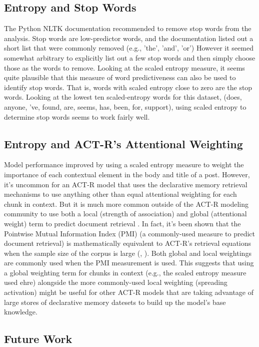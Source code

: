 \documentclass[10pt,letterpaper]{article}
\begin{document}
\subsection{Entropy and Stop Words}

The Python NLTK documentation \cite{Bird2009} recommended to remove stop words from the analysis.
Stop words are low-predictor words, and the documentation listed out a short list that were commonly removed (e.g., 'the', 'and', 'or')
However it seemed somewhat arbitrary to explicitly list out a few stop words and then simply choose those as the words to remove.
Looking at the scaled entropy measure, it seems quite plausible that this measure of word predictiveness can also be used to identify stop words.
That is, words with scaled entropy close to zero are the stop words.
Looking at the lowest ten scaled-entropy words for this dataset, (does, anyone, 've, found, are, seems, has, been, for, support), using scaled entropy to determine stop words seems to work fairly well.

\subsection{Entropy and ACT-R's Attentional Weighting}

Model performance improved by using a scaled entropy measure to weight the importance of each contextual element in the body and title of a post.
However, it's uncommon for an ACT-R model that uses the declarative memory retrieval mechanisms to use anything other than equal attentional weighting for each chunk in context.
But it is much more common outside of the ACT-R modeling community to use both a local (strength of association) and global (attentional weight) term to predict document retrieval .
In fact, it's been shown that the Pointwise Mutual Information Index (PMI) (a commonly-used measure to predict document retrieval) is mathematically equivalent to ACT-R's retrieval equations when the sample size of the corpus is large (, ).
Both global and local weightings are commonly used when the PMI measurement is used.
This suggests that using a global weighting term for chunks in context (e.g., the scaled entropy measure used ehre) alongside the more commonly-used local weighting (spreading activation) might be useful for other ACT-R models that are taking advantage of large stores of declarative memory datesets to build up the model's base knowledge.

\subsection{Future Work}
\end{document}
